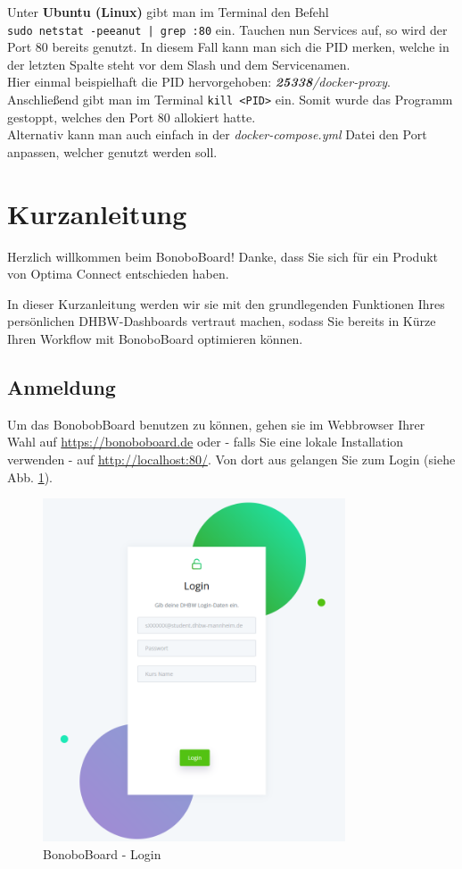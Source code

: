 \documentclass[a4paper,11pt]{scrartcl}
\begin{document}
\noindent Unter \textbf{Ubuntu (Linux)} gibt man im Terminal den Befehl\\
\texttt{sudo netstat -peeanut | grep :80} ein.
Tauchen nun Services auf, so wird der Port 80 bereits genutzt.
In diesem Fall kann man sich die PID merken, welche in der letzten Spalte steht vor dem Slash und dem Servicenamen.\\
Hier einmal beispielhaft die PID hervorgehoben: \textit{\textbf{25338}/docker-proxy}.
Anschließend gibt man im Terminal \texttt{kill <PID>} ein.
Somit wurde das Programm gestoppt, welches den Port 80 allokiert hatte.\\
Alternativ kann man auch einfach in der \textit{docker-compose.yml} Datei den Port anpassen,
welcher genutzt werden soll.

\section{Kurzanleitung}\label{Kurzanleitung}
Herzlich willkommen beim BonoboBoard! Danke, dass Sie sich für ein Produkt von Optima Connect entschieden haben. 

\bigskip
In dieser Kurzanleitung werden wir sie mit den grundlegenden Funktionen Ihres persönlichen DHBW-Dashboards vertraut machen, sodass Sie bereits in Kürze Ihren Workflow mit BonoboBoard optimieren können.

\subsection{Anmeldung}
Um das BonobobBoard benutzen zu können, gehen sie im Webbrowser Ihrer Wahl auf \url{https://bonoboboard.de} oder - falls Sie eine lokale Installation verwenden - auf \url{http://localhost:80/}. Von dort aus gelangen Sie zum Login (siehe Abb. \ref{img:login}).

\begin{figure}[H]
	\begin{center}
		\includegraphics[width=0.8\textwidth]{login}
		\caption{BonoboBoard - Login}
		\label{img:login}
	\end{center}
\end{figure}
\noindent
\end{document}
